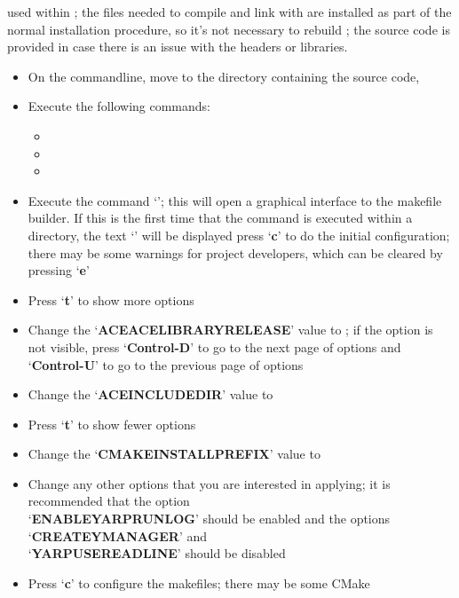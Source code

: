 used within \mplusm{}; the files needed to compile and link with \yarp{} are installed as
part of the normal \mplusm{} installation procedure, so it's not necessary to rebuild
\yarp{}; the source code is provided in case there is an issue with the headers or
libraries.
\begin{itemize}
\item On the command\longDash{}line, move to the directory containing the \mplusm{} source
code, 
\item\exSp{} Execute the following commands:
\begin{itemize}
\item{}
\item\exSp{}
\item\exSp{}
\end{itemize}
\item\exSp{} Execute the command `'; this will open a graphical
interface to the makefile builder. If this is the first time that the command is executed
within a directory, the text `' will be displayed \longDash{} press
`\textbf{c}' to do the initial configuration; there may be some warnings for project
developers, which can be cleared by pressing `\textbf{e}'
\item\exSp{} Press `\textbf{t}' to show more options
\item\exSp{} Change the `\textbf{ACE\fUS{}ACE\fUS{}LIBRARY\fUS{}RELEASE}' value to
; if the option is not visible, press
`\textbf{Control-D}' to go to the next page of options and `\textbf{Control-U}' to go to
the previous page of options
\item\exSp{} Change the `\textbf{ACE\fUS{}INCLUDE\fUS{}DIR}' value to
\item\exSp{} Press `\textbf{t}' to show fewer options
\item\exSp{} Change the `\textbf{CMAKE\fUS{}INSTALL\fUS{}PREFIX}' value to
\item\exSp{} Change any other options that you are interested in applying; it is
recommended that the option\\
`\textbf{ENABLE\fUS{}YARPRUN\fUS{}LOG}' should be enabled and the options
`\textbf{CREATE\fUS{}YMANAGER}' and\\
`\textbf{YARP\fUS{}USE\fUS{}READLINE}' should be disabled
\item\exSp{} Press `\textbf{c}' to configure the makefiles; there may be some CMake

\end{itemize}
